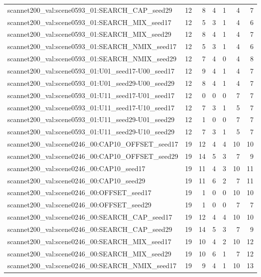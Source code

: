 \begin{table}[t]
\begin{tabular}{lrrrrrr}
scannet200\_val:scene0593\_01:SEARCH\_CAP\_seed29 & 12 & 8 & 4 & 1 & 4 & 7 \\
scannet200\_val:scene0593\_01:SEARCH\_MIX\_seed17 & 12 & 5 & 3 & 1 & 4 & 6 \\
scannet200\_val:scene0593\_01:SEARCH\_MIX\_seed29 & 12 & 8 & 4 & 1 & 4 & 7 \\
scannet200\_val:scene0593\_01:SEARCH\_NMIX\_seed17 & 12 & 5 & 3 & 1 & 4 & 6 \\
scannet200\_val:scene0593\_01:SEARCH\_NMIX\_seed29 & 12 & 7 & 4 & 0 & 4 & 8 \\
scannet200\_val:scene0593\_01:U01\_seed17-U00\_seed17 & 12 & 9 & 4 & 1 & 4 & 7 \\
scannet200\_val:scene0593\_01:U01\_seed29-U00\_seed29 & 12 & 8 & 4 & 1 & 4 & 7 \\
scannet200\_val:scene0593\_01:U11\_seed17-U01\_seed17 & 12 & 0 & 0 & 0 & 7 & 7 \\
scannet200\_val:scene0593\_01:U11\_seed17-U10\_seed17 & 12 & 7 & 3 & 1 & 5 & 7 \\
scannet200\_val:scene0593\_01:U11\_seed29-U01\_seed29 & 12 & 1 & 0 & 0 & 7 & 7 \\
scannet200\_val:scene0593\_01:U11\_seed29-U10\_seed29 & 12 & 7 & 3 & 1 & 5 & 7 \\
scannet200\_val:scene0246\_00:CAP10\_OFFSET\_seed17 & 19 & 12 & 4 & 4 & 10 & 10 \\
scannet200\_val:scene0246\_00:CAP10\_OFFSET\_seed29 & 19 & 14 & 5 & 3 & 7 & 9 \\
scannet200\_val:scene0246\_00:CAP10\_seed17 & 19 & 11 & 4 & 3 & 10 & 11 \\
scannet200\_val:scene0246\_00:CAP10\_seed29 & 19 & 11 & 6 & 2 & 7 & 11 \\
scannet200\_val:scene0246\_00:OFFSET\_seed17 & 19 & 1 & 0 & 0 & 10 & 10 \\
scannet200\_val:scene0246\_00:OFFSET\_seed29 & 19 & 1 & 0 & 0 & 7 & 7 \\
scannet200\_val:scene0246\_00:SEARCH\_CAP\_seed17 & 19 & 12 & 4 & 4 & 10 & 10 \\
scannet200\_val:scene0246\_00:SEARCH\_CAP\_seed29 & 19 & 14 & 5 & 3 & 7 & 9 \\
scannet200\_val:scene0246\_00:SEARCH\_MIX\_seed17 & 19 & 10 & 4 & 2 & 10 & 12 \\
scannet200\_val:scene0246\_00:SEARCH\_MIX\_seed29 & 19 & 10 & 6 & 1 & 7 & 12 \\
scannet200\_val:scene0246\_00:SEARCH\_NMIX\_seed17 & 19 & 9 & 4 & 1 & 10 & 13 \\

\end{tabular}
\end{table}

